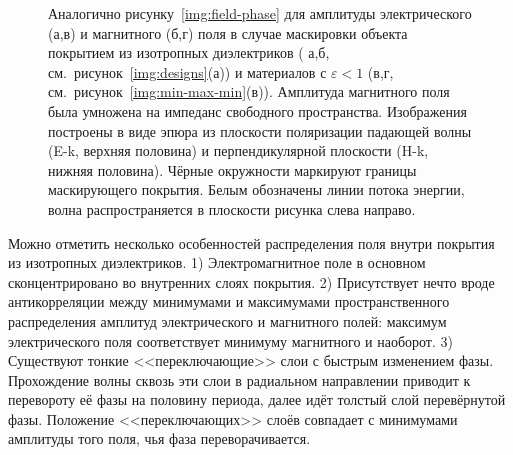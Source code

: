 \begin{figure}[p]
  \begin{minipage}[ht]{0.495\linewidth}
  \end{minipage}
  \hfill
  \begin{minipage}[ht]{0.495\linewidth}
  \end{minipage}
  \begin{minipage}[ht]{0.495\linewidth}
  \end{minipage}
  \hfill
  \begin{minipage}[ht]{0.495\linewidth}
  \end{minipage}

  \caption{Аналогично рисунку~\ref{img:field-phase} для амплитуды
    электрического (а,в) и магнитного (б,г) поля в случае маскировки
    объекта покрытием из изотропных диэлектриков ( а,б,
    см.~рисунок~\ref{img:designs}(а)) и материалов с
    ${\varepsilon <1}$ (в,г,
    см.~рисунок~\ref{img:min-max-min}(в)). Амплитуда магнитного поля
    была умножена на импеданс свободного пространства. Изображения
    построены в виде эпюра из плоскости поляризации падающей волны
    (E-k, верхняя половина) и перпендикулярной плоскости (H-k, нижняя
    половина). Чёрные окружности маркируют границы маскирующего
    покрытия. Белым обозначены линии потока энергии, волна
    распространяется в плоскости рисунка слева направо.}
  \label{img:field-amplitude}
\end{figure}

Можно отметить несколько особенностей распределения поля внутри
покрытия из изотропных диэлектриков. 1) Электромагнитное поле в
основном сконцентрировано во внутренних слоях покрытия. 2)
Присутствует нечто вроде антикорреляции между минимумами и максимумами
пространственного распределения амплитуд электрического и магнитного
полей: максимум электрического поля соответствует минимуму магнитного
и наоборот. 3) Существуют тонкие <<переключающие>> слои с быстрым
изменением фазы.  Прохождение волны сквозь эти слои в радиальном
направлении приводит к перевороту её фазы на половину периода, далее
идёт толстый слой перевёрнутой фазы.  Положение <<переключающих>>
слоёв совпадает с минимумами амплитуды того поля, чья фаза
переворачивается.

